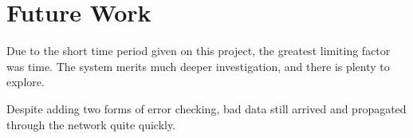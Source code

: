 \section{Future Work}
\label{section:future_work}

Due to the short time period given on this project, the greatest limiting factor was time. The system merits much deeper investigation, and there is plenty to explore.

Despite adding two forms of error checking, bad data still arrived and propagated through the network quite quickly.